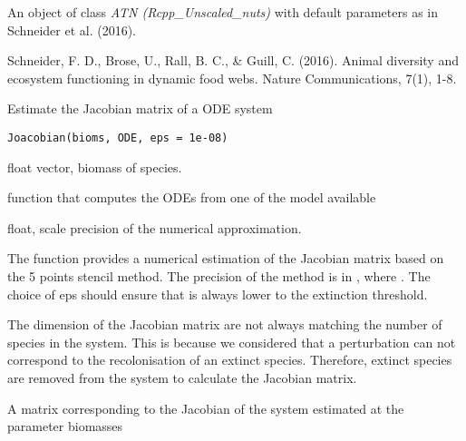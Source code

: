 \documentclass[letterpaper]{book}
\begin{document}
%
\begin{Value}
An object of class \emph{ATN (Rcpp\_Unscaled\_nuts)} with default
parameters as in Schneider et al. (2016).
\end{Value}
%
\begin{References}\relax
Schneider, F. D., Brose, U., Rall, B. C., \& Guill, C. (2016).
Animal diversity and ecosystem functioning in dynamic food webs. Nature
Communications, 7(1), 1-8.
\end{References}
%
\begin{Description}\relax
Estimate the Jacobian matrix of a ODE system
\end{Description}
%
\begin{Usage}
\begin{verbatim}
Joacobian(bioms, ODE, eps = 1e-08)
\end{verbatim}
\end{Usage}
%
\begin{Arguments}
\begin{ldescription}
\item[\code{bioms}] float vector, biomass of species.

\item[\code{ODE}] function that computes the ODEs from one of the model available

\item[\code{eps}] float, scale precision of the numerical approximation.
\end{ldescription}
\end{Arguments}
%
\begin{Details}\relax
The function provides a numerical estimation of the Jacobian matrix
based on the 5 points stencil method. The precision of the method is in  ,
where . The choice of eps should ensure that 
is always lower to the extinction threshold.

The dimension of the Jacobian matrix are not always matching the number of species in the system.
This is because we considered that a perturbation can not correspond to the recolonisation of an extinct species.
Therefore, extinct species are removed from the system to calculate the Jacobian matrix.
\end{Details}
%
\begin{Value}
A matrix corresponding to the Jacobian  of the system estimated at the parameter biomasses
\end{Value}
\end{document}
